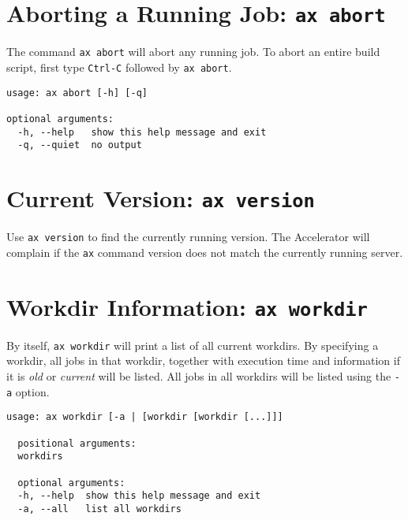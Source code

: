 \section{Aborting a Running Job: \texttt{ax abort}}
The command \texttt{ax abort} will abort any running job.  To abort an
entire build script, first type \texttt{Ctrl-C} followed by \texttt{ax
  abort}.
\begin{snugshade}
\begin{verbatim}
usage: ax abort [-h] [-q]

optional arguments:
  -h, --help   show this help message and exit
  -q, --quiet  no output
\end{verbatim}
\end{snugshade}


\section{Current Version: \texttt{ax version}}
Use \texttt{ax version} to find the currently running version.  The
Accelerator will complain if the \texttt{ax} command version does not
match the currently running server.


\section{Workdir Information: \texttt{ax workdir}}
By itself, \texttt{ax workdir} will print a list of all current
workdirs.  By specifying a workdir, all jobs in that workdir, together
with execution time and information if it is \textsl{old} or
\textsl{current} will be listed.  All jobs in all workdirs will be
listed using the \texttt{-a} option.
\begin{snugshade}
\begin{verbatim}
usage: ax workdir [-a | [workdir [workdir [...]]]

  positional arguments:
  workdirs

  optional arguments:
  -h, --help  show this help message and exit
  -a, --all   list all workdirs
\end{verbatim}
\end{snugshade}


